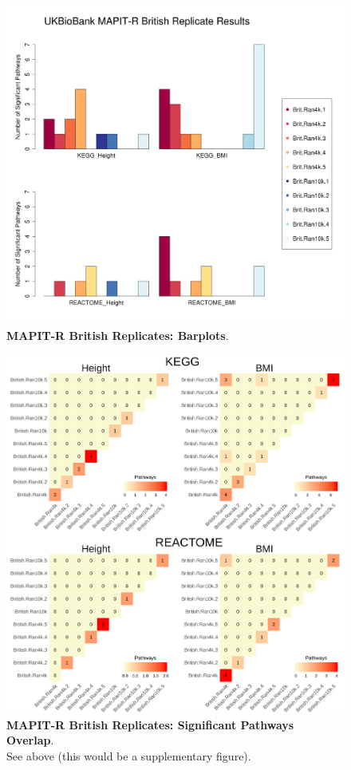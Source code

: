 \documentclass[12pt, a4paper]{article}
\begin{document}
\begin{figure}[htbp]
\centering
\includegraphics[scale=.45]{Images/Supp/InterPath_Supp_Figure_BritReps_Barplot_vs2.png}
\caption[TBD]{\textbf{MAPIT-R British Replicates: Barplots}. }
\label{InterPath-Supp-Figure-BritReps-Barplots}
\end{figure}
\clearpage

\begin{figure}[htbp]
\centering
\hspace*{-1.5cm}
\includegraphics[scale=.24]{Images/Supp/InterPath_Supp_Figure_BritReps_Heatplots_AllPaths_vs2.png}
\caption[TBD]{\textbf{MAPIT-R British Replicates: Significant Pathways Overlap}. \\ See above (this would be a supplementary figure).}
\label{InterPath-Supp-Figure-BritReps-Heatplots-AllPaths}
\end{figure}
\clearpage
\end{document}
